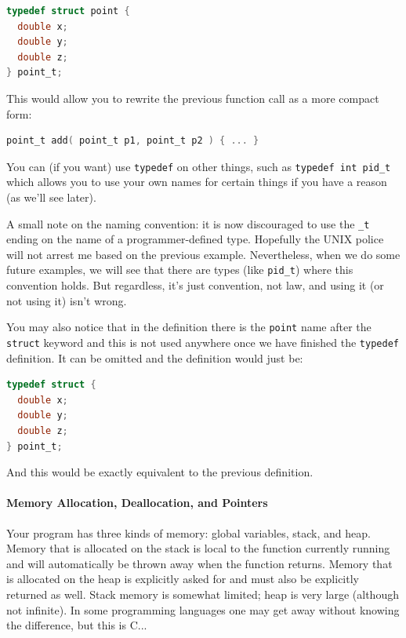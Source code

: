 \documentclass[a4paper]{report}
\begin{document}
\begin{lstlisting}[language=C]
typedef struct point {
  double x;
  double y;
  double z;
} point_t;
\end{lstlisting}

This would allow you to rewrite the previous function call as a more compact form:

\begin{lstlisting}[language=C]
point_t add( point_t p1, point_t p2 ) { ... }
\end{lstlisting}

You can (if you want) use \texttt{typedef} on other things, such as \texttt{typedef int pid\_t} which allows you to use your own names for certain things if you have a reason (as we'll see later).

A small note on the naming convention: it is now discouraged to use the \texttt{\_t} ending on the name of a programmer-defined type. Hopefully the UNIX police will not arrest me based on the previous example. Nevertheless, when we do some future examples, we will see that there are types (like \texttt{pid\_t}) where this convention holds. But regardless, it's just convention, not law, and using it (or not using it) isn't wrong.

You may also notice that in the definition there is the \texttt{point} name after the \texttt{struct} keyword and this is not used anywhere once we have finished the \texttt{typedef} definition. It can be omitted and the definition would just be:

\begin{lstlisting}[language=C]
typedef struct {
  double x;
  double y;
  double z;
} point_t;
\end{lstlisting}

And this would be exactly equivalent to the previous definition.

\paragraph{Memory Allocation, Deallocation, and Pointers}

Your program has three kinds of memory: global variables, stack, and heap. Memory that is allocated on the stack is local to the function currently running and will automatically be thrown away when the function returns. Memory that is allocated on the heap is explicitly asked for and must also be explicitly returned as well. Stack memory is somewhat limited; heap is very large (although not infinite). In some programming languages one may get away without knowing the difference, but this is C...
\end{document}

